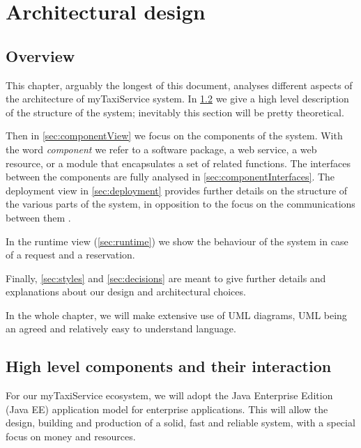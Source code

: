 \chapter{Architectural design} \label{chap:architectural}


\section{Overview}
This chapter, arguably the longest of this document, analyses different aspects of the architecture of myTaxiService system. In \cref{sec:highlevel} we give a high level description of the structure of the system; inevitably this section will be pretty theoretical.

Then in \cref{sec:componentView} we focus on the components of the system. With the word \emph{component} we refer to a software package, a web service, a web resource, or a module that encapsulates a set of related functions. The interfaces between the components are fully analysed in \cref{sec:componentInterfaces}. The deployment view in \cref{sec:deployment} provides further details on the structure of the various parts of the system, in opposition to the focus on the communications between them . 

In the runtime view (\cref{sec:runtime}) we show the behaviour of the system in case of a request and a reservation. 

Finally, \cref{sec:styles} and \cref{sec:decisions} are meant to give further details and explanations about our design and architectural choices.

In the whole chapter, we will make extensive use of UML diagrams, UML being an agreed and relatively easy to understand language.


\section{High level components and their interaction}\label{sec:highlevel}



For our myTaxiService ecosystem, we will adopt the Java Enterprise Edition (Java EE) application model for enterprise applications. This will allow the design, building and production of a solid, fast and reliable system, with a special focus on money and resources. 

